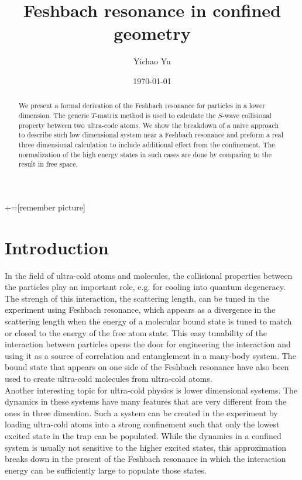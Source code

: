 \documentclass[aps,twocolumn,secnumarabic,balancelastpage,amsmath,amssymb,nofootinbib]{revtex4}
\begin{document}
+=[remember picture]
\title{Feshbach resonance in confined geometry}
\author{Yichao Yu}
\date{\today}

\begin{abstract}
  We present a formal derivation of the Feshbach resonance for particles in a lower dimension. The generic $T$-matrix method is used to calculate the $S$-wave collisional property between two ultra-code atoms. We show the breakdown of a naive approach to describe such low dimensional system near a Feshbach resonance and preform a real three dimensional calculation to include additional effect from the confinement. The normalization of the high energy states in such cases are done by comparing to the result in free space.
\end{abstract}

\maketitle
\section*{Introduction}
In the field of ultra-cold atoms and molecules, the collisional properties between the particles play an important role, e.g. for cooling into quantum degeneracy. The strengh of this interaction, the scattering length, can be tuned in the experiment using Feshbach resonance, which appears as a divergence in the scattering length when the energy of a molecular bound state is tuned to match or closed to the energy of the free atom state. This easy tunability of the interaction between particles opens the door for engineering the interaction and using it as a source of correlation and entanglement in a many-body system. The bound state that appears on one side of the Feshbach resonance have also been used to create ultra-cold molecules from ultra-cold atoms.\\

Another interesting topic for ultra-cold physics is lower dimensional systems. The dynamics in these systems have many features that are very different from the ones in three dimention. Such a system can be created in the experiment by loading ultra-cold atoms into a strong confinement such that only the lowest excited state in the trap can be populated. While the dynamics in a confined system is usually not sensitive to the higher excited states, this approximation breaks down in the present of the Feshbach resonance in which the interaction energy can be sufficiently large to populate those states.\\
\end{document}
